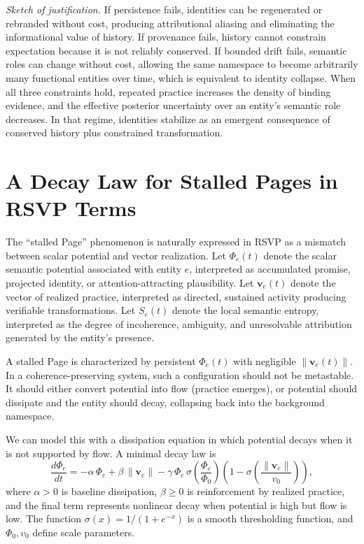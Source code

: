 \documentclass[11pt,oneside]{article}
\begin{document}
\textit{Sketch of justification.} If persistence fails, identities can be regenerated or rebranded without cost, producing attributional aliasing and eliminating the informational value of history. If provenance fails, history cannot constrain expectation because it is not reliably conserved. If bounded drift fails, semantic roles can change without cost, allowing the same namespace to become arbitrarily many functional entities over time, which is equivalent to identity collapse. When all three constraints hold, repeated practice increases the density of binding evidence, and the effective posterior uncertainty over an entity’s semantic role decreases. In that regime, identities stabilize as an emergent consequence of conserved history plus constrained transformation.

\section{A Decay Law for Stalled Pages in RSVP Terms}

The ``stalled Page'' phenomenon is naturally expressed in RSVP as a mismatch between scalar potential and vector realization. Let $\Phi_e(t)$ denote the scalar semantic potential associated with entity $e$, interpreted as accumulated promise, projected identity, or attention-attracting plausibility. Let $\mathbf{v}_e(t)$ denote the vector of realized practice, interpreted as directed, sustained activity producing verifiable transformations. Let $S_e(t)$ denote the local semantic entropy, interpreted as the degree of incoherence, ambiguity, and unresolvable attribution generated by the entity’s presence.

A stalled Page is characterized by persistent $\Phi_e(t)$ with negligible $\|\mathbf{v}_e(t)\|$. In a coherence-preserving system, such a configuration should not be metastable. It should either convert potential into flow (practice emerges), or potential should dissipate and the entity should decay, collapsing back into the background namespace.

We can model this with a dissipation equation in which potential decays when it is not supported by flow. A minimal decay law is
\[
\frac{d\Phi_e}{dt} = -\alpha\,\Phi_e + \beta\,\|\mathbf{v}_e\| - \gamma\,\Phi_e\,\sigma\!\left(\frac{\Phi_e}{\Phi_0}\right)\left(1-\sigma\!\left(\frac{\|\mathbf{v}_e\|}{v_0}\right)\right),
\]
where $\alpha>0$ is baseline dissipation, $\beta\ge 0$ is reinforcement by realized practice, and the final term represents nonlinear decay when potential is high but flow is low. The function $\sigma(x)=1/(1+e^{-x})$ is a smooth thresholding function, and $\Phi_0, v_0$ define scale parameters.
\end{document}

